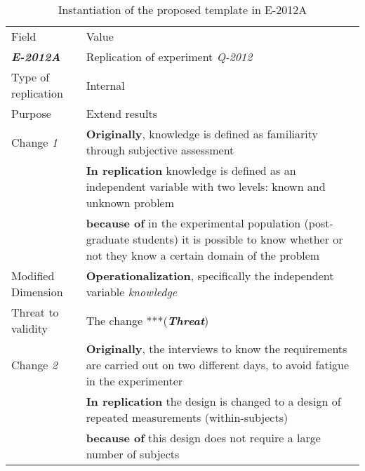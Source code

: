 \begin{table*}[h]
  \caption{Instantiation of the proposed template in E-2012A}
\label{tab:plantEng}
  \centering

\begin{tabularx}{\textwidth}{
  >{\hsize=0.3\hsize}X
  >{\hsize=0.8\hsize}X}
  
    \noalign{\smallskip}\hline\noalign{\smallskip}
  
  Field &  Value  \\ 
  \noalign{\smallskip}\hline\noalign{\smallskip}
  
\textbf {\textit{E-2012A}} &  Replication of experiment \textit{Q-2012 }    \\
Type of replication &  Internal   \\  
Purpose  & Extend results \\   \hline

    Change \textit{1}   & \textbf{Originally}, knowledge is defined as familiarity through subjective assessment\\& \textbf{In replication} knowledge is defined as an independent variable with two levels: known and unknown problem \\& \textbf{because of} in the experimental population (post-graduate students) it is possible to know whether or not they know a certain domain of the problem \\
    
    Modified Dimension & 
   \textbf{Operationalization}, specifically the independent variable \textit {knowledge} \\ 
    Threat to validity  & The change ***(\textbf{\textit{Threat}}) \\ \hline
  
    Change \textit{2}   & \textbf{Originally}, the interviews to know the requirements are carried out on two different days, to avoid fatigue in the experimenter \\& \textbf{In replication} the design is changed to a design of repeated measurements (within-subjects) \\& \textbf{because of} this design does not require a large number of subjects \\ 


\end{tabularx}
\end{table*}
